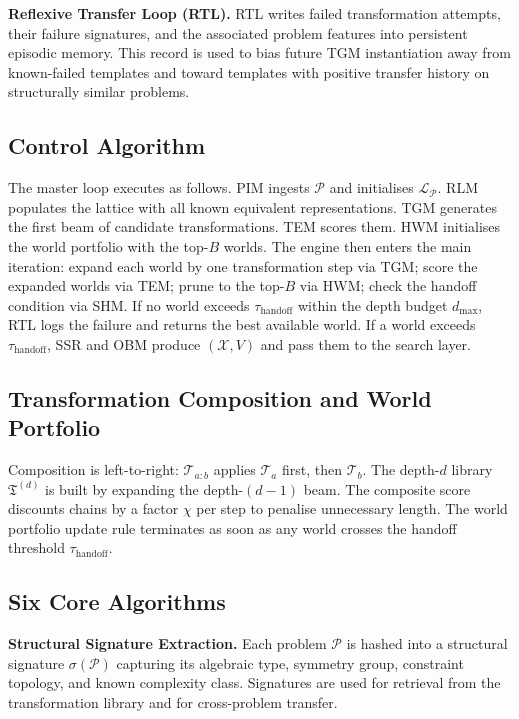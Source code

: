 \textbf{Reflexive Transfer Loop (RTL).} RTL writes failed transformation attempts, their failure signatures, and the associated problem features into persistent episodic memory. This record is used to bias future TGM instantiation away from known-failed templates and toward templates with positive transfer history on structurally similar problems.

\subsection{Control Algorithm}

The master loop executes as follows. PIM ingests $\mathcal{P}$ and initialises $\mathcal{L}_{\mathcal{P}}$. RLM populates the lattice with all known equivalent representations. TGM generates the first beam of candidate transformations. TEM scores them. HWM initialises the world portfolio with the top-$B$ worlds. The engine then enters the main iteration: expand each world by one transformation step via TGM; score the expanded worlds via TEM; prune to the top-$B$ via HWM; check the handoff condition via SHM. If no world exceeds $\tau_{\text{handoff}}$ within the depth budget $d_{\max}$, RTL logs the failure and returns the best available world. If a world exceeds $\tau_{\text{handoff}}$, SSR and OBM produce $(\mathcal{X}, V)$ and pass them to the search layer.

\subsection{Transformation Composition and World Portfolio}


Composition is left-to-right: $\mathcal{T}_{a:b}$ applies $\mathcal{T}_a$ first, then $\mathcal{T}_b$. The depth-$d$ library $\mathfrak{T}^{(d)}$ is built by expanding the depth-$(d-1)$ beam. The composite score discounts chains by a factor $\chi$ per step to penalise unnecessary length. The world portfolio update rule terminates as soon as any world crosses the handoff threshold $\tau_{\text{handoff}}$.

\subsection{Six Core Algorithms}

\textbf{Structural Signature Extraction.} Each problem $\mathcal{P}$ is hashed into a structural signature $\sigma(\mathcal{P})$ capturing its algebraic type, symmetry group, constraint topology, and known complexity class. Signatures are used for retrieval from the transformation library and for cross-problem transfer.

